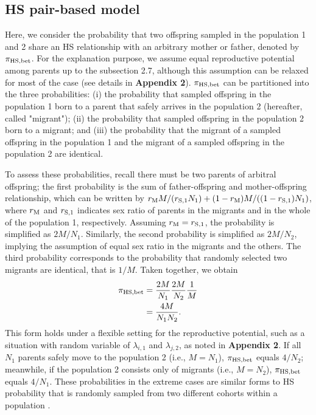 \documentclass[12pt, English]{article}
\begin{document}
\begin{spacing}{1.9}
\subsection{HS pair-based model}

Here, we consider the probability that two offspring sampled in the population 1 and 2 share an HS relationship with an arbitrary mother or father, denoted by $\pi_{\rm HS, bet}$. For the explanation purpose, we assume equal reproductive potential among parents up to the subsection 2.7, although this assumption can be relaxed for most of the case (see details in {\bf Appendix 2}). $\pi_{\rm HS, bet}$ can be partitioned into the three probabilities: (i) the probability that sampled offspring in the population 1 born to a parent that safely arrives in the population 2 (hereafter, called "migrant"); (ii) the probability that sampled offspring in the population 2 born to a migrant; and (iii) the probability that the migrant of a sampled offspring in the population 1 and the migrant of a sampled offspring in the population 2 are identical. 

To assess these probabilities, recall there must be two parents of arbitral offspring; the first probability is the sum of father-offspring and mother-offspring relationship, which can be written by $r_{\rm M}M/(r_{\rm S,1}N_{1}) + (1 - r_{\rm M})M/((1-r_{\rm S,1})N_{1})$, where $r_{\rm M}$ and $r_{\rm S,1}$ indicates sex ratio of parents in the migrants and in the whole of the population 1, respectively. Assuming $r_{\rm M} = r_{\rm S,1}$, the probability is simplified as $2M/N_{1}$. Similarly, the second probability is simplified as $2M/N_{2}$, implying the assumption of equal sex ratio in the migrants and the others. The third probability corresponds to the probability that randomly selected two migrants are identical, that is $1/M$. Taken together, we obtain
\begin{align}
\pi_{\rm HS,bet} &= \frac{2M}{N_{1}} \frac{2M}{N_{2}} \frac{1}{M} \nonumber\\
&= \frac{4M}{N_{1}N_{2}}.
\label{HS-1}
\end{align}
This form holds under a flexible setting for the reproductive potential, such as a situation with random variable of $\lambda_{i,1}$ and $\lambda_{j,2}$, as noted in {\bf Appendix 2}. If all $N_1$ parents safely move to the population 2 (i.e., $M = N_1$), $\pi_{\rm HS,bet}$ equals $4/N_2$; meanwhile, if the population 2 consists only of migrants (i.e., $M = N_2$), $\pi_{\rm HS,bet}$ equals $4/N_1$. These probabilities in the extreme cases are similar forms to HS probability that is randomly sampled from two different cohorts within a population \cite[]{bravington2016close}. 


\end{spacing}
\end{document}
